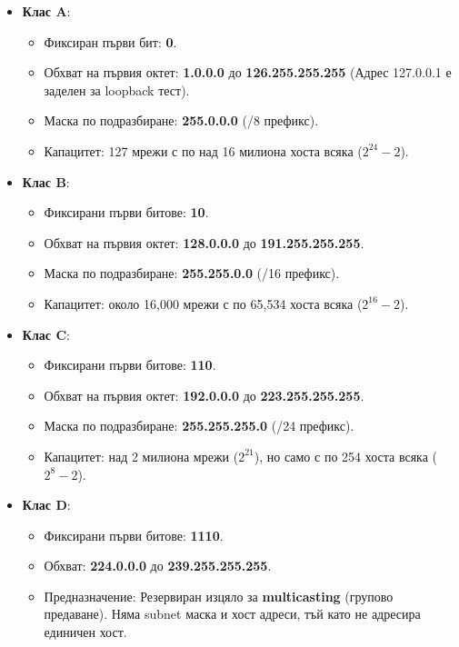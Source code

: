 \documentclass{scrartcl}
\begin{document}
\begin{FlushLeft}
\begin{itemize}
    \item \textbf{Клас A}:
    \begin{itemize}
        \item Фиксиран първи бит: \textbf{0}.
        \item Обхват на първия октет: \textbf{1.0.0.0} до \textbf{126.255.255.255} (Адрес 127.0.0.1 е заделен за loopback тест).
        \item Маска по подразбиране: \textbf{255.0.0.0} (/8 префикс).
        \item Капацитет: 127 мрежи с по над 16 милиона хоста всяка ($2^{24}-2$).
    \end{itemize}

    \item \textbf{Клас B}:
    \begin{itemize}
        \item Фиксирани първи битове: \textbf{10}.
        \item Обхват на първия октет: \textbf{128.0.0.0} до \textbf{191.255.255.255}.
        \item Маска по подразбиране: \textbf{255.255.0.0} (/16 префикс).
        \item Капацитет: около 16,000 мрежи с по 65,534 хоста всяка ($2^{16}-2$).
    \end{itemize}

    \item \textbf{Клас C}:
    \begin{itemize}
        \item Фиксирани първи битове: \textbf{110}.
        \item Обхват на първия октет: \textbf{192.0.0.0} до \textbf{223.255.255.255}.
        \item Маска по подразбиране: \textbf{255.255.255.0} (/24 префикс).
        \item Капацитет: над 2 милиона мрежи ($2^{21}$), но само с по 254 хоста всяка ($2^8-2$).
    \end{itemize}

    \item \textbf{Клас D}:
    \begin{itemize}
        \item Фиксирани първи битове: \textbf{1110}.
        \item Обхват: \textbf{224.0.0.0} до \textbf{239.255.255.255}.
        \item Предназначение: Резервиран изцяло за \textbf{multicasting} (групово предаване). Няма subnet маска и хост адреси, тъй като не адресира единичен хост.
    \end{itemize}


\end{itemize}
\end{FlushLeft}
\end{document}
